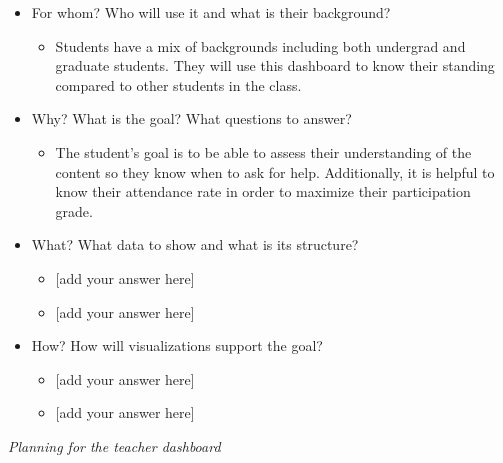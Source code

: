 \documentclass[
]{article}
\providecommand{\tightlist}{%
  \setlength{\itemsep}{0pt}\setlength{\parskip}{0pt}}
\begin{document}
\begin{itemize}
\tightlist
\item
  For whom? Who will use it and what is their background?

  \begin{itemize}
  \tightlist
  \item
    Students have a mix of backgrounds including both undergrad and
    graduate students. They will use this dashboard to know their
    standing compared to other students in the class.
  \end{itemize}
\item
  Why? What is the goal? What questions to answer?

  \begin{itemize}
  \tightlist
  \item
    The student's goal is to be able to assess their understanding of
    the content so they know when to ask for help. Additionally, it is
    helpful to know their attendance rate in order to maximize their
    participation grade.
  \end{itemize}
\item
  What? What data to show and what is its structure?

  \begin{itemize}
  \tightlist
  \item
    {[}add your answer here{]}
  \item
    {[}add your answer here{]}
  \end{itemize}
\item
  How? How will visualizations support the goal?

  \begin{itemize}
  \tightlist
  \item
    {[}add your answer here{]}
  \item
    {[}add your answer here{]}
  \end{itemize}
\end{itemize}

\emph{Planning for the teacher dashboard}
\end{document}
